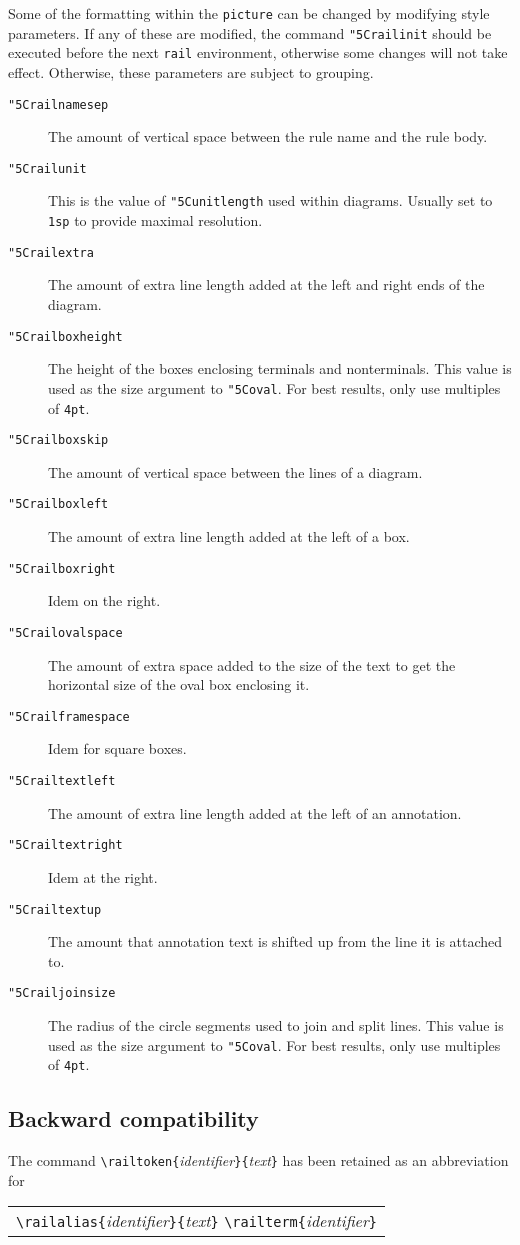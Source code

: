 \documentclass[a4paper]{article}
\newcommand\lit[1]{\texttt{#1}}
\newcommand\cs[1]{\lit{\char"5C\relax#1}}
\newenvironment{example}%
{\begin{trivlist}\item[]\begin{tabular}{l}}%
{\end{tabular}\end{trivlist}}
\begin{document}
Some of the formatting within the \lit{picture} can be changed by
modifying style parameters. If any of these are modified, the command
\cs{railinit} should be executed before the next \lit{rail}
environment, otherwise some changes will not take effect. Otherwise,
these parameters are subject to grouping.
\begin{description}
\item[\cs{railnamesep}]
The amount of vertical space between the rule name and the rule body.
\item[\cs{railunit}]
This is the value of \cs{unitlength} used within diagrams. Usually set to
\verb!1sp! to provide maximal resolution.
\item[\cs{railextra}]
The amount of extra line length added at the left and right ends of the
diagram.
\item[\cs{railboxheight}]
The height of the boxes enclosing terminals and nonterminals. This value
is used as the size argument to \cs{oval}. For best results, only use
multiples of \verb!4pt!.
\item[\cs{railboxskip}]
The amount of vertical space between the lines of a diagram.
\item[\cs{railboxleft}]
The amount of extra line length added at the left of a box.
\item[\cs{railboxright}]
Idem on the right.
\item[\cs{railovalspace}]
The amount of extra space added to the size of the text to get the
horizontal size of the oval box enclosing it.
\item[\cs{railframespace}]
Idem for square boxes.
\item[\cs{railtextleft}]
The amount of extra line length added at the left of an annotation.
\item[\cs{railtextright}]
Idem at the right.
\item[\cs{railtextup}]
The amount that annotation text is shifted up from the line it is
attached to.
\item[\cs{railjoinsize}]
The radius of the circle segments used to join and split lines. This
value is used as the size argument to \cs{oval}. For best results,
only use multiples of \verb!4pt!.
\end{description}

\subsection{Backward compatibility}

The command \verb!\railtoken{!\textit{identifier}\verb!}{!\textit{text}\verb!}!
has been retained as an abbreviation for
\begin{example}
\verb!\railalias{!\textit{identifier}\verb!}{!\textit{text}\verb!}!
\verb!\railterm{!\textit{identifier}\verb!}!
\end{example}
\end{document}
